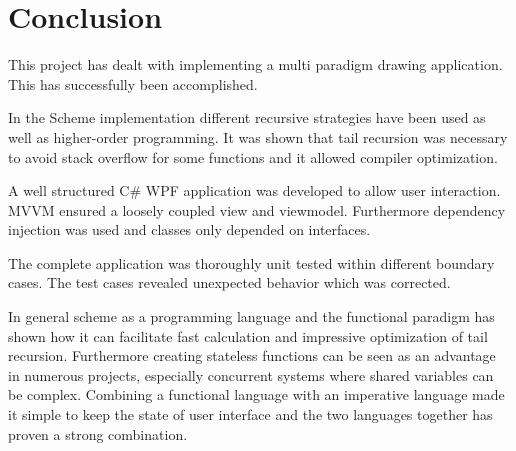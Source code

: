 \chapter{Conclusion}
\label{chp:conc}

This project has dealt with implementing a multi paradigm drawing application. This has successfully been accomplished. 

In the Scheme implementation different recursive strategies have been used as well as higher-order programming. It was shown that tail recursion was necessary to avoid stack overflow for some functions and it allowed compiler optimization. 

A well structured C\# WPF application was developed to allow user interaction. MVVM ensured a loosely coupled view and viewmodel. Furthermore dependency injection was used and classes only depended on interfaces.

The complete application was thoroughly unit tested within different boundary cases. The test cases revealed unexpected behavior which was corrected. 

In general scheme as a programming language and the functional paradigm has shown how it can facilitate fast calculation and impressive optimization of tail recursion. Furthermore creating stateless functions can be seen as an advantage in numerous projects, especially concurrent systems where shared variables can be complex. Combining a functional language with an imperative language made it simple to keep the state of user interface and the two languages together has proven a strong combination.